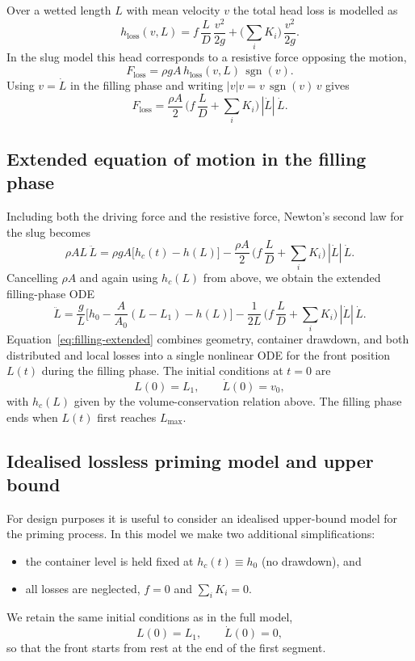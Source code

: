 \documentclass[11pt]{article}
\begin{document}
Over a wetted length $L$ with mean velocity $v$ the total head loss is modelled as
\[
  h_{\text{loss}}(v,L)
  = f\,\frac{L}{D}\,\frac{v^2}{2g}
    + \Big(\sum_i K_i\Big)\,\frac{v^2}{2g}.
\]
In the slug model this head corresponds to a resistive force opposing the motion,
\[
  F_{\text{loss}} = \rho g A\,h_{\text{loss}}(v,L)\,\operatorname{sgn}(v).
\]
Using $v = \dot L$ in the filling phase and writing $|v|v = v\,\operatorname{sgn}(v)\,v$ gives
\[
  F_{\text{loss}} = \frac{\rho A}{2}\,\Big(f\,\frac{L}{D} + \sum_i K_i\Big)\,|\dot L|\,\dot L.
\]

\subsection{Extended equation of motion in the filling phase}

Including both the driving force and the resistive force, Newton's second law for the slug
becomes
\begin{equation}
  \rho A L\,\ddot L
  = \rho g A\bigl[h_c(t) - h(L)\bigr]
    - \frac{\rho A}{2}\,\Big(f\,\frac{L}{D} + \sum_i K_i\Big)\,|\dot L|\,\dot L.
  \label{eq:filling-extended-raw}
\end{equation}
Cancelling $\rho A$ and again using $h_c(L)$ from above, we obtain the extended filling-phase
ODE
\begin{equation}
  \ddot L
  = \frac{g}{L}\Big[h_0 - \frac{A}{A_0}(L - L_1) - h(L)\Big]
    - \frac{1}{2L}\,\Big(f\,\frac{L}{D} + \sum_i K_i\Big)\,|\dot L|\,\dot L.
  \label{eq:filling-extended}
\end{equation}
Equation~\eqref{eq:filling-extended} combines geometry, container drawdown, and both distributed and local
losses into a single nonlinear ODE for the front position $L(t)$ during the filling phase.
The initial conditions at $t = 0$ are
\[
  L(0) = L_1,\qquad \dot L(0) = v_0,
\]
with $h_c(L)$ given by the volume-conservation relation above. The filling phase ends when
$L(t)$ first reaches $L_{\max}$.

\subsection{Idealised lossless priming model and upper bound}

For design purposes it is useful to consider an idealised upper-bound model for the priming
process. In this model we make two additional simplifications:
\begin{itemize}
  \item the container level is held fixed at $h_c(t) \equiv h_0$ (no drawdown), and
  \item all losses are neglected, $f = 0$ and $\sum_i K_i = 0$.
\end{itemize}
We retain the same initial conditions as in the full model,
\[
  L(0) = L_1,\qquad \dot L(0) = 0,
\]
so that the front starts from rest at the end of the first segment.
\end{document}
